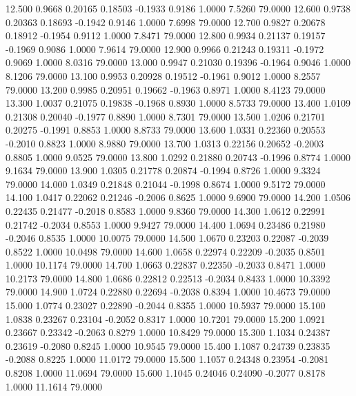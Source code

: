  12.500   0.9668   0.20165   0.18503  -0.1933   0.9186   1.0000   7.5260  79.0000
  12.600   0.9738   0.20363   0.18693  -0.1942   0.9146   1.0000   7.6998  79.0000
  12.700   0.9827   0.20678   0.18912  -0.1954   0.9112   1.0000   7.8471  79.0000
  12.800   0.9934   0.21137   0.19157  -0.1969   0.9086   1.0000   7.9614  79.0000
  12.900   0.9966   0.21243   0.19311  -0.1972   0.9069   1.0000   8.0316  79.0000
  13.000   0.9947   0.21030   0.19396  -0.1964   0.9046   1.0000   8.1206  79.0000
  13.100   0.9953   0.20928   0.19512  -0.1961   0.9012   1.0000   8.2557  79.0000
  13.200   0.9985   0.20951   0.19662  -0.1963   0.8971   1.0000   8.4123  79.0000
  13.300   1.0037   0.21075   0.19838  -0.1968   0.8930   1.0000   8.5733  79.0000
  13.400   1.0109   0.21308   0.20040  -0.1977   0.8890   1.0000   8.7301  79.0000
  13.500   1.0206   0.21701   0.20275  -0.1991   0.8853   1.0000   8.8733  79.0000
  13.600   1.0331   0.22360   0.20553  -0.2010   0.8823   1.0000   8.9880  79.0000
  13.700   1.0313   0.22156   0.20652  -0.2003   0.8805   1.0000   9.0525  79.0000
  13.800   1.0292   0.21880   0.20743  -0.1996   0.8774   1.0000   9.1634  79.0000
  13.900   1.0305   0.21778   0.20874  -0.1994   0.8726   1.0000   9.3324  79.0000
  14.000   1.0349   0.21848   0.21044  -0.1998   0.8674   1.0000   9.5172  79.0000
  14.100   1.0417   0.22062   0.21246  -0.2006   0.8625   1.0000   9.6900  79.0000
  14.200   1.0506   0.22435   0.21477  -0.2018   0.8583   1.0000   9.8360  79.0000
  14.300   1.0612   0.22991   0.21742  -0.2034   0.8553   1.0000   9.9427  79.0000
  14.400   1.0694   0.23486   0.21980  -0.2046   0.8535   1.0000  10.0075  79.0000
  14.500   1.0670   0.23203   0.22087  -0.2039   0.8522   1.0000  10.0498  79.0000
  14.600   1.0658   0.22974   0.22209  -0.2035   0.8501   1.0000  10.1174  79.0000
  14.700   1.0663   0.22837   0.22350  -0.2033   0.8471   1.0000  10.2173  79.0000
  14.800   1.0686   0.22812   0.22513  -0.2034   0.8433   1.0000  10.3392  79.0000
  14.900   1.0724   0.22880   0.22694  -0.2038   0.8394   1.0000  10.4673  79.0000
  15.000   1.0774   0.23027   0.22890  -0.2044   0.8355   1.0000  10.5937  79.0000
  15.100   1.0838   0.23267   0.23104  -0.2052   0.8317   1.0000  10.7201  79.0000
  15.200   1.0921   0.23667   0.23342  -0.2063   0.8279   1.0000  10.8429  79.0000
  15.300   1.1034   0.24387   0.23619  -0.2080   0.8245   1.0000  10.9545  79.0000
  15.400   1.1087   0.24739   0.23835  -0.2088   0.8225   1.0000  11.0172  79.0000
  15.500   1.1057   0.24348   0.23954  -0.2081   0.8208   1.0000  11.0694  79.0000
  15.600   1.1045   0.24046   0.24090  -0.2077   0.8178   1.0000  11.1614  79.0000
